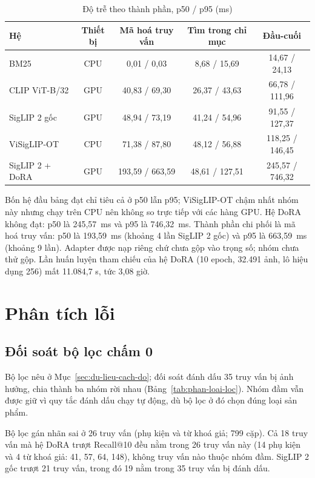 \begin{table}[H]
\centering
\caption{Độ trễ theo thành phần, p50 / p95 (ms)}
\label{tab:do-tre}
\footnotesize
\renewcommand{\arraystretch}{1.05}
\begin{tabular}{@{}l c c c c@{}}
\toprule
\textbf{Hệ} & \textbf{Thiết bị} & \textbf{Mã hoá truy vấn} & \textbf{Tìm trong chỉ mục} & \textbf{Đầu-cuối} \\
\midrule
BM25 & CPU & 0,01 / 0,03 & 8,68 / 15,69 & 14,67 / 24,13 \\
CLIP ViT-B/32 & GPU & 40,83 / 69,30 & 26,37 / 43,63 & 66,78 / 111,96 \\
SigLIP 2 gốc & GPU & 48,94 / 73,19 & 41,24 / 54,96 & 91,55 / 127,37 \\
ViSigLIP-OT & CPU & 71,38 / 87,80 & 48,12 / 56,88 & 118,25 / 146,45 \\
SigLIP 2 + DoRA & GPU & 193,59 / 663,59 & 48,61 / 127,51 & 245,57 / 746,32 \\
\bottomrule
\end{tabular}
\end{table}

Bốn hệ đầu bảng đạt chỉ tiêu cả ở p50 lẫn p95; ViSigLIP-OT chậm nhất nhóm này nhưng chạy trên CPU nên không so trực tiếp với các hàng GPU. Hệ DoRA không đạt: p50 là 245,57~ms và p95 là 746,32~ms. Thành phần chi phối là mã hoá truy vấn: p50 là 193,59~ms (khoảng 4 lần SigLIP 2 gốc) và p95 là 663,59~ms (khoảng 9 lần). Adapter được nạp riêng chứ chưa gộp vào trọng số; nhóm chưa thử gộp. Lần huấn luyện tham chiếu của hệ DoRA (10 epoch, 32.491 ảnh, lô hiệu dụng 256) mất 11.084,7 s, tức 3,08 giờ.

\section{Phân tích lỗi}
\label{sec:phan-tich-loi}

\subsection{Đối soát bộ lọc chấm 0}
\label{sec:doi-soat-nhan}

Bộ lọc nêu ở Mục~\ref{sec:du-lieu-cach-do}; đối soát đánh dấu 35 truy vấn bị ảnh hưởng, chia thành ba nhóm rời nhau (Bảng~\ref{tab:phan-loai-loc}). Nhóm đầm vẫn được giữ vì quy tắc đánh dấu chạy tự động, dù bộ lọc ở đó chọn đúng loại sản phẩm.

Bộ lọc gán nhãn sai ở 26 truy vấn (phụ kiện và từ khoá giả; 799 cặp). Cả 18 truy vấn mà hệ DoRA trượt Recall@10 đều nằm trong 26 truy vấn này (14 phụ kiện và 4 từ khoá giả: 41, 57, 64, 148), không truy vấn nào thuộc nhóm đầm. SigLIP 2 gốc trượt 21 truy vấn, trong đó 19 nằm trong 35 truy vấn bị đánh dấu.

